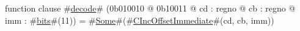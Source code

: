 function clause #\hyperref[zdecode]{decode}# (0b010010 @ 0b10011 @ cd : regno @ cb : regno @ imm : #\hyperref[zbits]{bits}#(11)) = #\hyperref[zSome]{Some}#(#\hyperref[zCIncOffsetImmediate]{CIncOffsetImmediate}#(cd, cb, imm))
